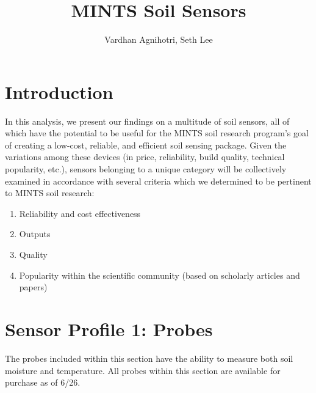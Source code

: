 \documentclass{article}
\title{MINTS Soil Sensors}
\author{Vardhan Agnihotri, Seth Lee}
\begin{document}
\maketitle

\section{Introduction}
In this analysis, we present our findings on a multitude of soil sensors, all of which have the potential to be useful for the MINTS soil research program's goal of creating a low-cost, reliable, and efficient soil sensing package. Given the variations among these devices (in price, reliability, build quality, technical popularity, etc.), sensors belonging to a unique category will be collectively examined in accordance with several criteria which we determined to be pertinent to MINTS soil research:
\begin{enumerate}
    \item Reliability and cost effectiveness
    \item Outputs
    \item Quality %
    \item Popularity within the scientific community (based on scholarly articles and papers)
\end{enumerate}


\section{Sensor Profile 1: Probes}
The probes included within this section have the ability to measure both soil moisture and temperature. All probes within this section are available for purchase as of 6/26.
\end{document}

